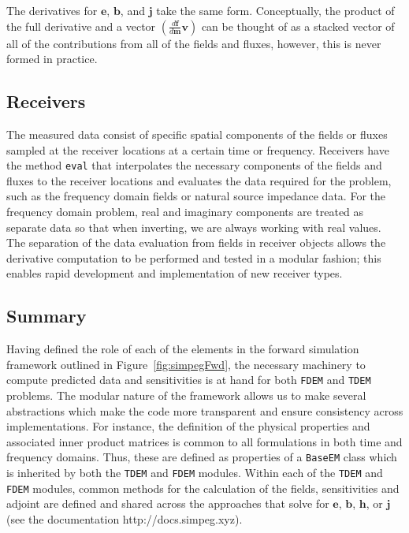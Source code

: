 \documentclass[preprint,review,3p,times,onecolumn,authoryear]{elsarticle}
\newcommand{\TDEM}{\texttt{TDEM}\xspace}
\newcommand{\FDEM}{\texttt{FDEM}\xspace}
\newcommand{\BaseEM}{\texttt{BaseEM}\xspace}
\begin{document}
The derivatives for $\mathbf{e}$, $\mathbf{b}$, and $\mathbf{j}$ take the same
form. Conceptually, the product of the full derivative and a vector
$\left(\frac{d\mathbf{f}}{d\mathbf{m}} \mathbf{v}\right)$ can be thought of as a stacked
vector of all of the contributions from all of the fields and fluxes, however,
this is never formed in practice.



\subsection{Receivers}
\label{sec:Receivers}

The measured data consist of specific spatial components of the fields or
fluxes sampled at the receiver locations at a certain time or frequency.
Receivers have the method \texttt{eval} that interpolates the necessary
components of the fields and fluxes to the receiver locations and evaluates
the data required for the problem, such as the frequency domain fields or
natural source impedance data. For the frequency domain problem, real and
imaginary components are treated as separate data so that when inverting, we
are always working with real values. The separation of the data evaluation
from fields in receiver objects allows the derivative computation to be
performed and tested in a modular fashion; this enables rapid development and
implementation of new receiver types.



\subsection{Summary}
\label{sec:Summary}

Having defined the role of each of the elements in the forward simulation
framework outlined in Figure~\ref{fig:simpegFwd}, the necessary machinery to
compute predicted data and sensitivities is at hand for both \FDEM and \TDEM
problems. The modular nature of the framework allows us to make several
abstractions which make the code more transparent and ensure consistency
across implementations. For instance, the definition of the physical
properties and associated inner product matrices is common to all formulations
in both time and frequency domains. Thus, these are defined as properties of a
\BaseEM class which is inherited by both the \TDEM and \FDEM modules. Within
each of the \TDEM and \FDEM modules, common methods for the calculation of the
fields, sensitivities and adjoint are defined and shared across the approaches
that solve for $\mathbf{e}$, $\mathbf{b}$, $\mathbf{h}$, or $\mathbf{j}$ (see
the documentation http://docs.simpeg.xyz).
\end{document}
